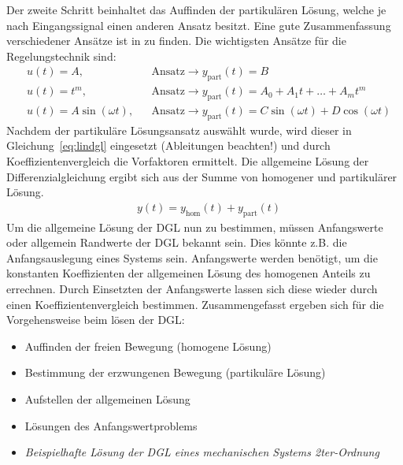 Der zweite Schritt beinhaltet das Auffinden der partikulären Lösung, welche je nach Eingangssignal einen anderen Ansatz besitzt. Eine gute Zusammenfassung verschiedener Ansätze ist in \cite{Furlan08,Gangster03} zu finden. Die wichtigsten Ansätze für die Regelungstechnik sind:
%
\begin{equation}
\begin{aligned}
&u(t) = A, &&\text{Ansatz} \rightarrow y_{\text{part}}(t) = B\\
&u(t) = t^{m}, &&\text{Ansatz} \rightarrow y_{\text{part}}(t) = A_{0}+A_{1}t+\ldots+A_{m}t^{m}\\
&u(t) = A\sin(\omega t), &&\text{Ansatz} \rightarrow y_{\text{part}}(t) = C\sin(\omega t)+D\cos(\omega t)
\end{aligned}
\end{equation}
%
Nachdem der partikuläre Lösungsansatz auswählt wurde, wird dieser in Gleichung~\ref{eq:lindgl} eingesetzt (Ableitungen beachten!) und durch Koeffizientenvergleich die Vorfaktoren ermittelt. Die allgemeine Lösung der Differenzialgleichung ergibt sich aus der Summe von homogener und partikulärer Lösung.
%
\begin{equation}
\begin{aligned}
&y(t)=y_{\text{hom}}(t)+y_{\text{part}}(t)
\end{aligned}
\end{equation}
%
Um die allgemeine Lösung der DGL nun zu bestimmen, müssen Anfangswerte oder allgemein Randwerte der DGL bekannt sein. Dies könnte z.B. die Anfangsauslegung eines Systems sein. Anfangswerte werden benötigt, um die konstanten Koeffizienten der allgemeinen Lösung des homogenen Anteils zu errechnen. Durch Einsetzten der Anfangswerte lassen sich diese wieder durch einen Koeffizientenvergleich bestimmen.
%
Zusammengefasst ergeben sich für die Vorgehensweise beim lösen der DGL:
\begin{itemize}
	\item Auffinden der freien Bewegung (homogene Lösung)
	\item Bestimmung der erzwungenen Bewegung (partikuläre Lösung)
	\item Aufstellen der allgemeinen Lösung
	\item Lösungen des Anfangswertproblems 
\end{itemize}
%
\begin{Aufgaben}{}{}
	\begin{itemize}
		\item \textit{Beispielhafte Lösung der DGL eines mechanischen Systems 2ter-Ordnung}
	\end{itemize}
\end{Aufgaben}
